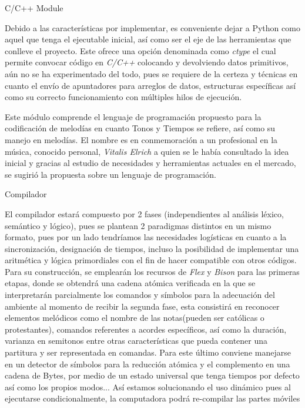 \documentclass{book}
\begin{document}
	{\large C/C++ Module}\par
	Debido a las características por implementar, es conveniente dejar a Python como aquel que tenga el ejecutable inicial, así como ser el eje de las herramientas que conlleve el proyecto. Este ofrece una opción denominada como \emph{ctype} el cual permite convocar código en \emph{C/C++} colocando y devolviendo datos primitivos, aún no se ha experimentado del todo, pues se requiere de la certeza y técnicas en cuanto el envío de apuntadores para arreglos de datos, estructuras específicas así como su correcto funcionamiento con múltiples hilos de ejecución.
	
	\par
	Este módulo comprende el lenguaje de programación propuesto para la codificación de melodías en cuanto Tonos y Tiempos se refiere, así como su manejo en melodías. El nombre es en conmemoración a un profesional en la música, conocido personal, \emph{Vitalis Elrich} a quien se le había consultado la idea inicial y gracias al estudio de necesidades y herramientas actuales en el mercado, se sugirió la propuesta sobre un lenguaje de programación.\par
	{\large Compilador}\par
	El compilador estará compuesto por 2 fases (independientes al análisis léxico, semántico y lógico), pues se plantean 2 paradigmas distintos en un mismo formato, pues por un lado tendríamos las necesidades logísticas en cuanto a la sincronización, designación de tiempos, incluso la posibilidad de implementar una aritmética y lógica primordiales con el fin de hacer compatible con otros códigos.
	Para su construcción, se emplearán los recursos de \emph{Flex} y \emph{Bison} para las primeras etapas, donde se obtendrá una cadena atómica verificada en la que se interpretarán parcialmente los comandos y símbolos para la adecuación del ambiente al momento de recibir la segunda fase, esta consistirá en reconocer elementos melódicos como el nombre de las notas(pueden ser católicas o protestantes), comandos referentes a acordes específicos, así como la duración, varianza en semitonos entre otras características que pueda contener una partitura y ser representada en comandas. Para este último conviene manejarse en un detector de símbolos para la reducción atómica y el complemento en una cadena de Bytes, por medio de un estado universal que tenga tiempos por defecto así como los propios modos... Así estamos solucionando el uso dinámico pues al ejecutarse condicionalmente, la computadora podrá re-compilar las partes móviles\par
\end{document}
